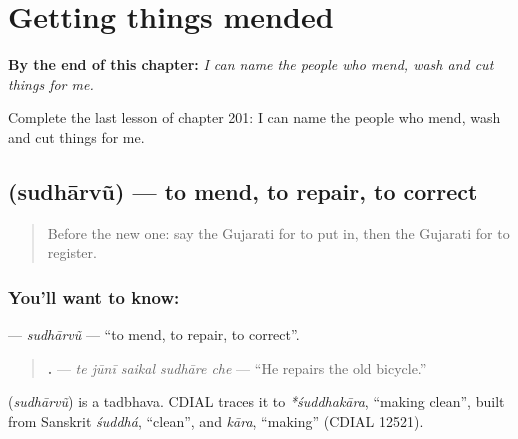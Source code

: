 
\chapter{Getting things mended}
\label{ch:gu-getting-things-mended}

\begin{chapteropening}
\textbf{By the end of this chapter:} \emph{I can name the people who mend, wash and cut things for me.}

Complete the last lesson of chapter 201: I can name the people who mend, wash and cut things for me.
\end{chapteropening}

\section[\texorpdfstring{\gu{સુધારવું} (sudhārvũ)}{સુધારવું (sudhārvũ)}]{ (sudhārvũ) — to mend, to repair, to correct}

\label{lesson:GU-C201-sudharvu}



\begin{quote}
Before the new one: say the Gujarati for to put in, then the Gujarati for to register.
\end{quote}

\subsection*{You'll want to know: }
\textbf{} — \emph{sudhārvũ} — \textquotedblleft{}to mend, to repair, to correct\textquotedblright{}.

\begin{quote}
\textbf{    .} — \emph{te jūnī saikal sudhāre che} — \textquotedblleft{}He repairs the old bicycle.\textquotedblright{}
\end{quote}

\begin{cousinweb}
\textbf{} (\emph{sudhārvũ}) is a tadbhava. CDIAL traces it to \emph{*śuddhakāra}, \textquotedblleft{}making clean\textquotedblright{}, built from Sanskrit \emph{śuddhá}, \textquotedblleft{}clean\textquotedblright{}, and \emph{kāra}, \textquotedblleft{}making\textquotedblright{} (CDIAL 12521).
\end{cousinweb}

